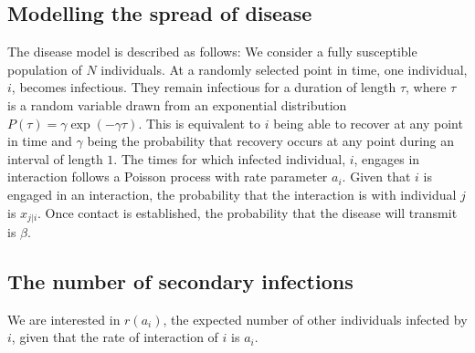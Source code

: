 \documentclass[10pt]{article}
\begin{document}
\begin{multicols}{2}
\section{Modelling the spread of disease}
The disease model is described as follows: We consider a fully susceptible population of $N$ individuals. At a randomly selected point in time, one individual, $i$, becomes infectious. They remain infectious for a duration of length $\tau$, where $\tau$ is a random variable drawn from an exponential distribution $P(\tau)=\gamma \exp(-\gamma \tau)$. This is equivalent to $i$ being able to recover at any point in time and $\gamma$ being the probability that recovery occurs at any point during an interval of length $1$. The times for which infected individual, $i$, engages in interaction follows a Poisson process with rate parameter $a_{i}$. Given that $i$ is engaged in an interaction, the probability that the interaction is with individual $j$ is $x_{j|i}$. Once contact is established, the probability that the disease will transmit is $\beta$.

\subsection{The number of secondary infections}
\label{disease_derivation}
We are interested in $r(a_{i})$, the expected number of other individuals infected by $i$, given that the rate of interaction of $i$ is $a_{i}$. 


\end{multicols}
\end{document}
